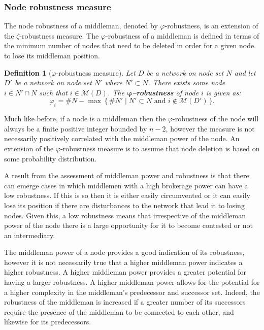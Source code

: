 \documentclass[11pt,fleqn]{article}
\newtheorem{definition}[theorem]{Definition}
\begin{document}
\subsubsection{Node robustness measure}

The node robustness of a middleman, denoted by $\varphi$-robustness, is an extension of the $\zeta$-robustness measure. The $\varphi$-robustness of a middleman is defined in terms of the minimum number of nodes that need to be deleted in order for a given node to lose its middleman position.

\begin{definition}[$\varphi$-robustness measure]
Let $D$ be a network on node set $N$ and let $D'$ be a network on node set $N'$ where $N' \subset N$. There exists some node $i \in N' \cap N$ such that $i \in \mathcal{M}(D)$. The \textbf{$\mathbf{\varphi}$--robustness} of node $i$ is given as:
\begin{equation}
\varphi_{i} = \# N - \max \, \{ \, \# N' \mid N' \subset N \mbox{ and } i \notin \mathcal{M}(D') \, \} . 
\end{equation}
\end{definition}

Much like before, if a node is a middleman then the $\varphi$-robustness of the node will always be a finite positive integer bounded by $n-2$, however the measure is not necessarily positively correlated with the middleman power of the node. An extension of the $\varphi$-robustness measure is to assume that node deletion is based on some probability distribution.

\medskip \noindent A result from the assessment of middleman power and robustness is that there can emerge cases in which middlemen with a high brokerage power can have a low robustness. If this is so then it is either easily circumvented or it can easily lose its position if there are disturbances to the network that lead it to losing nodes. Given this, a low robustness means that irrespective of the middleman power of the node there is a large opportunity for it to become contested or not an intermediary.

The middleman power of a node provides a good indication of its robustness, however it is not necessarily true that a higher middleman power indicates a higher robustness. A higher middleman power provides a greater potential for having a larger robustness. A higher middleman power allows for the potential for a higher complexity in the middleman's predecessor and successor set. Indeed, the robustness of the middleman is increased if a greater number of its successors require the presence of the middleman to be connected to each other, and likewise for its predecessors.
\end{document}
